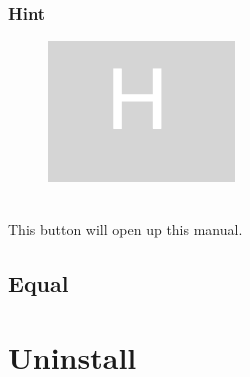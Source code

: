 \documentclass[11pt, a4paper]{article}
\theoremstyle{definition}
\begin{document}
    \subsubsection[scale = 0.2]{Hint}


    \begin{figure}[h]
        \includegraphics[scale = 0.2]{hint}
        \centering
        \label{fig:h}
    \end{figure}
    \\
    This button will open up this manual.

    \subsection{Equal}


    \section{Uninstall}
\end{document}
